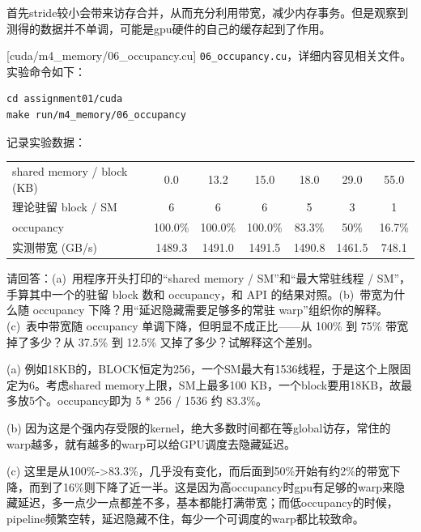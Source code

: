 \documentclass[11pt,a4paper,fontset=none]{ctexart}
\begin{document}
首先stride较小会带来访存合并，从而充分利用带宽，减少内存事务。但是观察到测得的数据并不单调，可能是gpu硬件的自己的缓存起到了作用。

[cuda/m4\_memory/06\_occupancy.cu]
\texttt{06\_occupancy.cu}，详细内容见相关文件。实验命令如下：

\begin{lstlisting}
cd assignment01/cuda
make run/m4_memory/06_occupancy
\end{lstlisting}

记录实验数据：

\begin{center}\small
\begin{tabular}{@{}lcccccc@{}}
\toprule
shared memory / block (KB) & 0.0 & 13.2 & 15.0 & 18.0 & 29.0 & 55.0 \\
理论驻留 block / SM & 6 & 6 & 6 & 5 & 3 & 1 \\
occupancy & 100.0\% & 100.0\% & 100.0\% & 83.3\% & 50\% & 16.7\% \\
实测带宽 (GB/s) & 1489.3 & 1491.0 & 1491.5 & 1490.8 & 1461.5 & 748.1 \\
\bottomrule
\end{tabular}
\end{center}

请回答：(a)~用程序开头打印的“shared memory / SM”和“最大常驻线程 / SM”，手算其中一个的驻留 block 数和 occupancy，和 API 的结果对照。(b)~带宽为什么随 occupancy 下降？用“延迟隐藏需要足够多的常驻 warp”组织你的解释。(c)~表中带宽随 occupancy 单调下降，但明显不成正比——从 100\% 到 75\% 带宽掉了多少？从 37.5\% 到 12.5\% 又掉了多少？试解释这个差别。

(a) 例如18KB的，BLOCK恒定为256，一个SM最大有1536线程，于是这个上限固定为6。考虑shared memory上限，SM上最多100 KB，一个block要用18KB，故最多放5个。occupancy即为 5 * 256 / 1536 约 83.3\%。

(b) 因为这是个强内存受限的kernel，绝大多数时间都在等global访存，常住的warp越多，就有越多的warp可以给GPU调度去隐藏延迟。

(c) 这里是从100\%->83.3\%，几乎没有变化，而后面到50\%开始有约2\%的带宽下降，而到了16\%则下降了近一半。这是因为高occupancy时gpu有足够的warp来隐藏延迟，多一点少一点都差不多，基本都能打满带宽；而低occupancy的时候，pipeline频繁空转，延迟隐藏不住，每少一个可调度的warp都比较致命。
\end{document}
